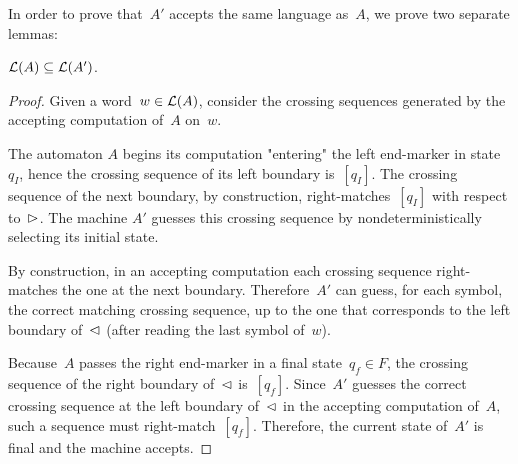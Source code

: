 In order to prove that~$A'$ accepts the same language as~$A$, we prove two separate lemmas:
\begin{lemm}\label{lem:2DFAto1NFA-1}
	$\mathcal L(A)\subseteq\mathcal L(A')$.
\end{lemm}
\begin{proof}
	Given a word~$w\in\mathcal L(A)$, consider the crossing sequences generated by the accepting computation of~$A$ on~$w$.

	The automaton $A$ begins its computation "entering" the left end-marker in state~$q_I$, hence the crossing sequence of its left boundary is~$[q_I]$.
	The crossing sequence of the next boundary, by construction, right-matches~$[q_I]$ with respect to~$\rhd$.
	The machine $A'$ guesses this crossing sequence by nondeterministically selecting its initial state.

	By construction, in an accepting computation each crossing sequence right-matches the one at the next boundary.
	Therefore~$A'$ can guess, for each symbol, the correct matching crossing sequence, up to the one that corresponds to the left boundary of~$\lhd$ (after reading the last symbol of~$w$).

	Because~$A$ passes the right end-marker in a final state~$q_f\in F$, the crossing sequence of the right boundary of~$\lhd$ is~$[q_f]$.
	Since~$A'$ guesses the correct crossing sequence at the left boundary of~$\lhd$ in the accepting computation of~$A$, such a sequence must right-match~$[q_f]$.
	Therefore, the current state of~$A'$ is final and the machine accepts.
\end{proof}



